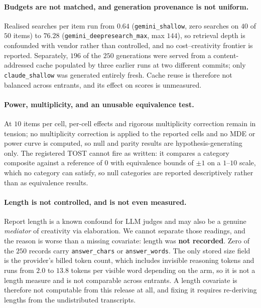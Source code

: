 \paragraph{Budgets are not matched, and generation provenance is not uniform.} Realised searches per
item run from $0.64$ (\texttt{gemini\_shallow}, zero searches on $40$ of $50$ items) to $76.28$
(\texttt{gemini\_deepresearch\_max}, max $144$), so retrieval depth is confounded with vendor rather
than controlled, and no cost--creativity frontier is reported. Separately, $196$ of the $250$
generations were served from a content-addressed cache populated by three earlier runs at two
different commits; only \texttt{claude\_shallow} was generated entirely fresh. Cache reuse is
therefore not balanced across entrants, and its effect on scores is unmeasured.

\paragraph{Power, multiplicity, and an unusable equivalence test.} At $10$ items per cell, per-cell
effects and rigorous multiplicity correction remain in tension; no multiplicity correction is
applied to the reported cells and no MDE or power curve is computed, so null and parity results are
hypothesis-generating only. The registered TOST cannot fire as written: it compares a category
composite against a reference of $0$ with equivalence bounds of $\pm1$ on a $1$--$10$ scale, which
no category can satisfy, so null categories are reported descriptively rather than as equivalence
results.

\paragraph{Length is not controlled, and is not even measured.} Report length is a known confound for
LLM judges and may also be a genuine \emph{mediator} of creativity via elaboration. We cannot separate
those readings, and the reason is worse than a missing covariate: length was \textbf{not recorded}.
Zero of the $250$ records carry \texttt{answer\_chars} or \texttt{answer\_words}. The only stored size
field is the provider's billed token count, which includes invisible reasoning tokens and runs from
$2.0$ to $13.8$ tokens per visible word depending on the arm, so it is not a length measure and is not
comparable across entrants. A length covariate is therefore not computable from this release at all,
and fixing it requires re-deriving lengths from the undistributed transcripts.


